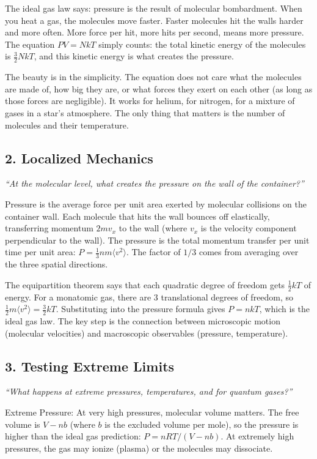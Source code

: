 \documentclass[11pt,openright]{book}
\begin{document}
The ideal gas law says: pressure is the result of molecular bombardment. When you heat a gas, the molecules move faster. Faster molecules hit the walls harder and more often. More force per hit, more hits per second, means more pressure. The equation $PV = NkT$ simply counts: the total kinetic energy of the molecules is $\frac{3}{2}NkT$, and this kinetic energy is what creates the pressure.

The beauty is in the simplicity. The equation does not care what the molecules are made of, how big they are, or what forces they exert on each other (as long as those forces are negligible). It works for helium, for nitrogen, for a mixture of gases in a star's atmosphere. The only thing that matters is the number of molecules and their temperature.

\subsection*{2. Localized Mechanics}
\textit{``At the molecular level, what creates the pressure on the wall of the container?''}

Pressure is the average force per unit area exerted by molecular collisions on the container wall. Each molecule that hits the wall bounces off elastically, transferring momentum $2mv_x$ to the wall (where $v_x$ is the velocity component perpendicular to the wall). The pressure is the total momentum transfer per unit time per unit area: $P = \frac{1}{3}nm\langle v^2\rangle$. The factor of $1/3$ comes from averaging over the three spatial directions.

The equipartition theorem says that each quadratic degree of freedom gets $\frac{1}{2}kT$ of energy. For a monatomic gas, there are 3 translational degrees of freedom, so $\frac{1}{2}m\langle v^2\rangle = \frac{3}{2}kT$. Substituting into the pressure formula gives $P = nkT$, which is the ideal gas law. The key step is the connection between microscopic motion (molecular velocities) and macroscopic observables (pressure, temperature).

\subsection*{3. Testing Extreme Limits}
\textit{``What happens at extreme pressures, temperatures, and for quantum gases?''}

Extreme Pressure: At very high pressures, molecular volume matters. The free volume is $V - nb$ (where $b$ is the excluded volume per mole), so the pressure is higher than the ideal gas prediction: $P = nRT/(V - nb)$. At extremely high pressures, the gas may ionize (plasma) or the molecules may dissociate.
\end{document}
